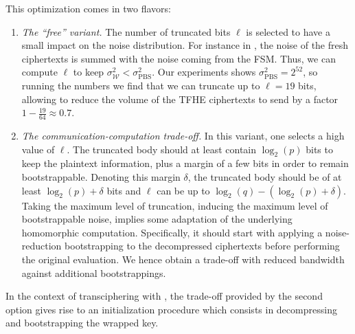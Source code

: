 \noindent This optimization comes in two flavors:
\begin{enumerate}
	\item \emph{The ``free'' variant.} The number of truncated bits $\ell$ is selected to have a small impact on the noise distribution. For instance in \coolName, the noise of the fresh ciphertexts is summed with the noise coming from the FSM. Thus, we can compute $\ell$ to keep $\sigma^2_{\mathcal W} < \sigma^2_{\text{PBS}}$. Our experiments shows $\sigma^2_{\text{PBS}} = 2^{52}$, so running the numbers we find that we can truncate up to $\ell=19$ bits, allowing to reduce the volume of the TFHE ciphertexts to send by a factor $1 - \frac{19}{64} \approx 0.7$.
	
	\smallskip
	
	\item \emph{The communication-computation trade-off.} In this variant, one selects a high value of $\ell$. The truncated body should at least contain $\log_2(p)$ bits to keep the plaintext information, plus a margin of a few bits in order to remain bootstrappable. Denoting this margin $\delta$, the truncated body should be of at least $\log_2(p) + \delta$ bits and $\ell$ can be up to $\log_2(q) - (\log_2(p)+\delta)$. Taking the maximum level of truncation, inducing the maximum level of bootstrappable noise, implies some adaptation of the underlying homomorphic computation. Specifically, it should start with applying a noise-reduction bootstrapping to the decompressed ciphertexts before performing the original evaluation. We hence obtain a trade-off with reduced bandwidth against additional bootstrappings.
\end{enumerate}

In the context of transciphering with \coolName, the trade-off provided by the second option gives rise to an initialization procedure which consists in decompressing and bootstrapping the wrapped key. 




